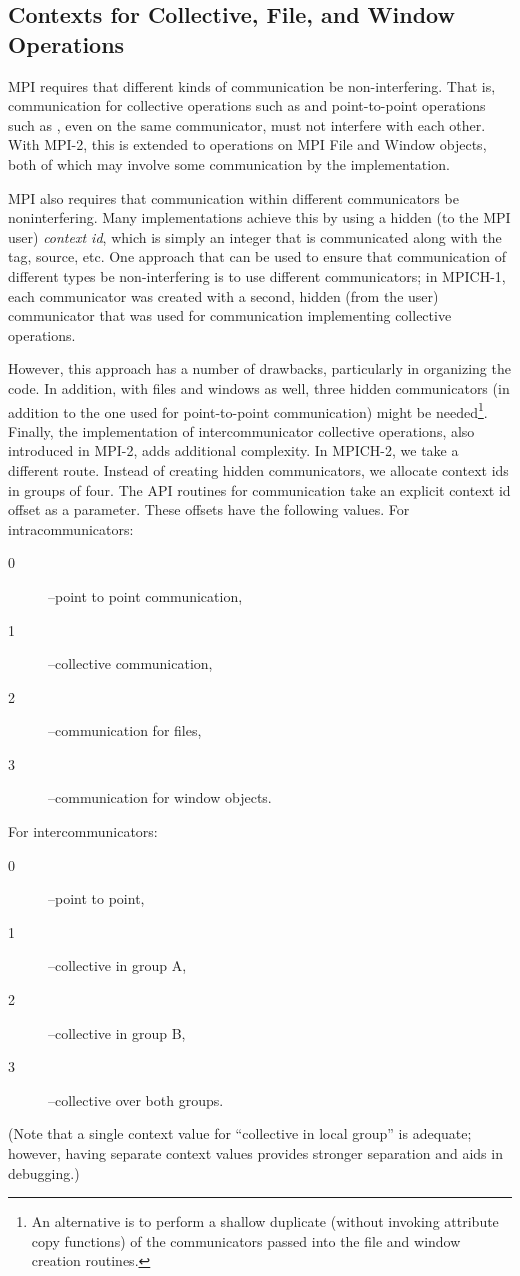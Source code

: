 {\subsection{Contexts for Collective, File, and Window Operations}
\label{sec:comm-for-coll}
MPI requires that different kinds of communication be
non-interfering.  That is, communication for collective operations
such as  and point-to-point operations such as
, even on the same communicator, must not interfere
with each other.  With MPI-2, this is extended to operations on MPI
File and Window objects, both of which may involve some communication
by the implementation.

MPI also requires that communication within different
communicators be noninterfering.  Many implementations achieve this by
using a hidden (to the MPI user) \emph{context id},
which is simply an 
integer that is communicated along with the tag, source, etc.  
One approach that can be used to ensure that
communication of different types be non-interfering is to use
different communicators; in MPICH-1, each communicator was created
with a second, hidden (from the user) communicator that was used for
communication implementing collective operations.  

However, this approach has a number of drawbacks, particularly in
organizing the code.  In addition, with files and windows as well,
three hidden communicators (in addition to the one used for point-to-point
communication) might be needed\footnote{An alternative is
to perform a shallow duplicate (without invoking attribute copy
functions) of the communicators passed into the file and window
creation routines.}.  Finally, the implementation of intercommunicator
collective operations, also introduced in MPI-2, adds additional
complexity.  In MPICH-2, we take a different route.  Instead of
creating hidden communicators, we allocate context ids in groups of
four.  The API routines for communication take an explicit context id
offset as a parameter.  These offsets have the following values.  For
intracommunicators: 
\begin{description}
\item[0]--point to point communication, 
\item[1]--collective communication, 
\item[2]--communication for files, 
\item[3]--communication for window objects.  
\end{description}
For intercommunicators: 
\begin{description}
\item[0]--point to point, 
\item[1]--collective in group A, 
\item[2]--collective in group B, 
\item[3]--collective over both groups.
\end{description}
(Note that a single context value for ``collective in local group'' is
adequate; however, having separate context values provides stronger
separation and aids in debugging.)
%

}

